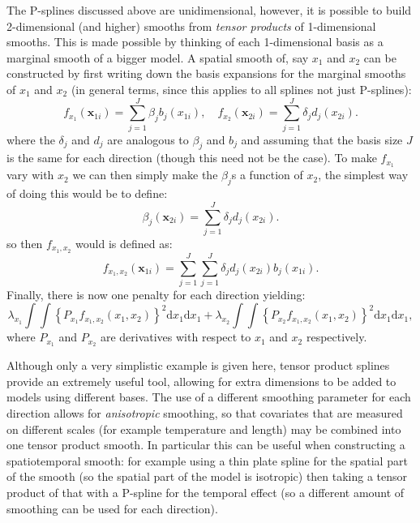 The P-splines discussed above are unidimensional, however, it is possible to build 2-dimensional (and higher) smooths from \textit{tensor products} of 1-dimensional smooths. This is made possible by thinking of each 1-dimensional basis as a marginal smooth of a bigger model. A spatial smooth of, say $x_1$ and $x_2$ can be constructed by first writing down the basis expansions for the marginal smooths of $x_1$ and $x_2$ (in general terms, since this applies to all splines not just P-splines):
\begin{equation*}
f_{x_1}(\mathbf{x}_{1i}) = \sum_{j=1}^J \beta_j b_j(x_{1i}), \quad  f_{x_2}(\mathbf{x}_{2i}) = \sum_{j=1}^J \delta_j d_j(x_{2i}).
\end{equation*}
where the $\delta_j$ and $d_j$ are analogous to $\beta_j$ and $b_j$ and assuming that the basis size $J$ is the same for each direction (though this need not be the case). To make $f_{x_1}$ vary with $x_2$ we can then simply make the $\beta_j$s a function of $x_2$, the simplest way of doing this would be to define:
\begin{equation*}
\beta_j(\mathbf{x}_{2i}) = \sum_{j=1}^J \delta_j d_j(x_{2i}).
\end{equation*}
so then $f_{x_1,x_2}$ would is defined as:
\begin{equation*}
f_{x_1, x_2}(\mathbf{x}_{1i}) = \sum_{j=1}^J \sum_{j=1}^J \delta_j d_j(x_{2i}) b_j(x_{1i}).
\end{equation*}
Finally, there is now one penalty for each direction yielding:
\begin{equation*}
\lambda_{x_1} \int\int \left \{P_{x_1} f_{x_1, x_2}(x_1,x_2)\right \}^2 \text{d}x_1\text{d}x_1 + \lambda_{x_2} \int\int \left \{P_{x_2} f_{x_1, x_2}(x_1,x_2)\right \}^2 \text{d}x_1\text{d}x_1,
\end{equation*}
where $P_{x_1}$ and $P_{x_2}$ are derivatives with respect to $x_1$ and $x_2$ respectively. 

Although only a very simplistic example is given here, tensor product splines provide an extremely useful tool, allowing for extra dimensions to be added to models using different bases. The use of a different smoothing parameter for each direction allows for \textit{anisotropic} smoothing, so that covariates that are measured on different scales (for example temperature and length) may be combined into one tensor product smooth. In particular this can be useful when constructing a spatiotemporal smooth: for example using a thin plate spline for the spatial part of the smooth (so the spatial part of the model is isotropic) then taking a tensor product of that with a P-spline for the temporal effect (so a different amount of smoothing can be used for each direction).

